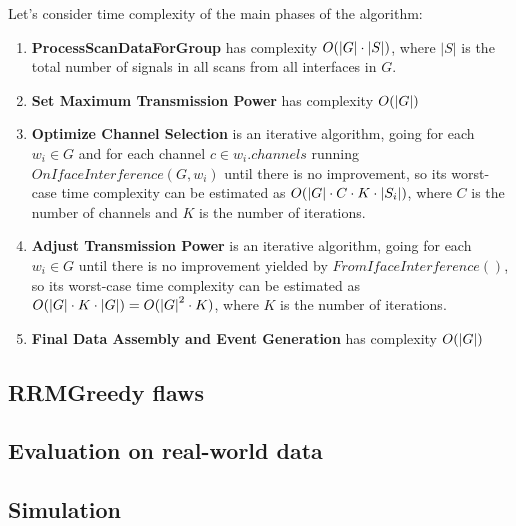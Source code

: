 Let's consider time complexity of the main phases of the algorithm:

\begin{enumerate}
    \item \textbf{ProcessScanDataForGroup} has complexity $O(\lvert{G}\rvert \cdot \lvert S \rvert)$, where $\lvert S \rvert$ is the total number of signals in all scans from all interfaces in $G$.
    \item \textbf{Set Maximum Transmission Power} has complexity $O(\lvert{G}\rvert)$
    \item \textbf{Optimize Channel Selection} is an iterative algorithm, going for each $w_i \in G$ and for each channel $c \in w_i.channels$ running $OnIfaceInterference(G, w_i)$ until there is no improvement, so its worst-case time complexity can be estimated as $O(\lvert{G}\rvert \cdot C \cdot K \cdot \lvert{S_i}\rvert)$, where $C$ is the number of channels and $K$ is the number of iterations.
    \item \textbf{Adjust Transmission Power} is an iterative algorithm, going for each $w_i \in G$ until there is no improvement yielded by $FromIfaceInterference()$, so its worst-case time complexity can be estimated as $O(\lvert{G}\rvert \cdot K \cdot \lvert{G}\rvert) = O({\lvert{G}\rvert}^2 \cdot K)$, where $K$ is the number of iterations.
    \item \textbf{Final Data Assembly and Event Generation} has complexity $O(\lvert{G}\rvert)$
\end{enumerate}

\subsection{RRMGreedy flaws}
\label{sec:flaws}

\subsection{Evaluation on real-world data}
\label{sec:eval}

\subsection{Simulation}
\label{sec:sim}
